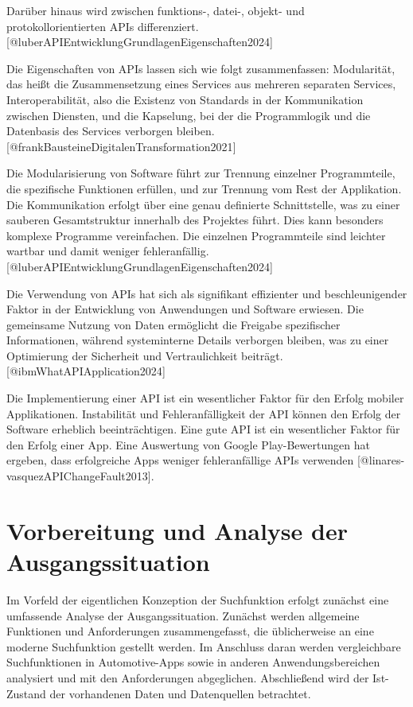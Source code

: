 \documentclass[
  12pt,
  a4paperpaper,
]{report}
\begin{document}
Darüber hinaus wird zwischen funktions-, datei-, objekt- und
protokollorientierten APIs differenziert.
{[}@luberAPIEntwicklungGrundlagenEigenschaften2024{]}

Die Eigenschaften von APIs lassen sich wie folgt zusammenfassen:
Modularität, das heißt die Zusammensetzung eines Services aus mehreren
separaten Services, Interoperabilität, also die Existenz von Standards
in der Kommunikation zwischen Diensten, und die Kapselung, bei der die
Programmlogik und die Datenbasis des Services verborgen bleiben.
{[}@frankBausteineDigitalenTransformation2021{]}

Die Modularisierung von Software führt zur Trennung einzelner
Programmteile, die spezifische Funktionen erfüllen, und zur Trennung vom
Rest der Applikation. Die Kommunikation erfolgt über eine genau
definierte Schnittstelle, was zu einer sauberen Gesamtstruktur innerhalb
des Projektes führt. Dies kann besonders komplexe Programme
vereinfachen. Die einzelnen Programmteile sind leichter wartbar und
damit weniger fehleranfällig.
{[}@luberAPIEntwicklungGrundlagenEigenschaften2024{]}

Die Verwendung von APIs hat sich als signifikant effizienter und
beschleunigender Faktor in der Entwicklung von Anwendungen und Software
erwiesen. Die gemeinsame Nutzung von Daten ermöglicht die Freigabe
spezifischer Informationen, während systeminterne Details verborgen
bleiben, was zu einer Optimierung der Sicherheit und Vertraulichkeit
beiträgt. {[}@ibmWhatAPIApplication2024{]}

Die Implementierung einer API ist ein wesentlicher Faktor für den Erfolg
mobiler Applikationen. Instabilität und Fehleranfälligkeit der API
können den Erfolg der Software erheblich beeinträchtigen. Eine gute API
ist ein wesentlicher Faktor für den Erfolg einer App. Eine Auswertung
von Google Play-Bewertungen hat ergeben, dass erfolgreiche Apps weniger
fehleranfällige APIs verwenden {[}@linares-vasquezAPIChangeFault2013{]}.

\chapter{Vorbereitung und Analyse der
Ausgangssituation}\label{vorbereitung-und-analyse-der-ausgangssituation}

Im Vorfeld der eigentlichen Konzeption der Suchfunktion erfolgt zunächst
eine umfassende Analyse der Ausgangssituation. Zunächst werden
allgemeine Funktionen und Anforderungen zusammengefasst, die
üblicherweise an eine moderne Suchfunktion gestellt werden. Im Anschluss
daran werden vergleichbare Suchfunktionen in Automotive-Apps sowie in
anderen Anwendungsbereichen analysiert und mit den Anforderungen
abgeglichen. Abschließend wird der Ist-Zustand der vorhandenen Daten und
Datenquellen betrachtet.
\end{document}

